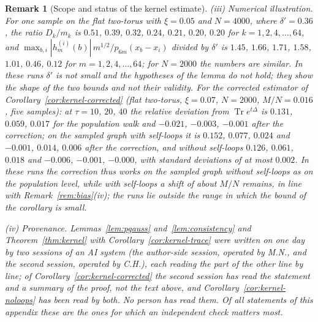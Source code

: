 \documentclass[11pt,a4paper]{article}
\theoremstyle{stmt}
\theoremstyle{defn}
\theoremstyle{rmk}
\newtheorem{remark}[theorem]{Remark}
\numberwithin{equation}{section}
\DeclareMathOperator{\Tr}{Tr}
\begin{document}
{\begin{remark}[Scope and status of the kernel estimate]
(iii) \emph{Numerical illustration.} For one sample on the flat two-torus with $\xi=0.05$ and $N=4000$, where $\delta'=0.36$, the ratio $D_k/m_k$ is $0.51$, $0.39$, $0.32$, $0.24$, $0.21$, $0.20$, $0.20$ for $k=1,2,4,\dots,64$, and $\max_{b,i}|h^{(i)}_m(b)|\,m^{1/2}/p_{6m}(x_b-x_i)$ divided by $\delta'$ is $1.45$, $1.66$, $1.71$, $1.58$, $1.01$, $0.46$, $0.12$ for $m=1,2,4,\dots,64$; for $N=2000$ the numbers are similar. In these runs $\delta'$ is not small and the hypotheses of the lemma do not hold; they show the shape of the two bounds and not their validity. For the corrected estimator of Corollary~\ref{cor:kernel-corrected} (flat two-torus, $\xi=0.07$, $N=2000$, $M/N=0.016$, five samples): at $\tau=10$, $20$, $40$ the relative deviation from $\Tr e^{t\Delta}$ is $0.131$, $0.059$, $0.017$ for the population walk and $-0.021$, $-0.003$, $-0.001$ after the correction; on the sampled graph with self-loops it is $0.152$, $0.077$, $0.024$ and $-0.001$, $0.014$, $0.006$ after the correction, and without self-loops $0.126$, $0.061$, $0.018$ and $-0.006$, $-0.001$, $-0.000$, with standard deviations of at most $0.002$. In these runs the correction thus works on the sampled graph without self-loops as on the population level, while with self-loops a shift of about $M/N$ remains, in line with Remark~\ref{rem:bias}(iv); the runs lie outside the range in which the bound of the corollary is small.

(iv) \emph{Provenance.} Lemmas~\ref{lem:pgauss} and~\ref{lem:consistency} and Theorem~\ref{thm:kernel} with Corollary~\ref{cor:kernel-trace} were written on one day by two sessions of an AI system (the author-side session, operated by M.N., and the second session, operated by C.H.), each reading the part of the other line by line; of Corollary~\ref{cor:kernel-corrected} the second session has read the statement and a summary of the proof, not the text above, and Corollary~\ref{cor:kernel-noloops} has been read by both. No person has read them. Of all statements of this appendix these are the ones for which an independent check matters most.
\end{remark}

}
\end{document}
